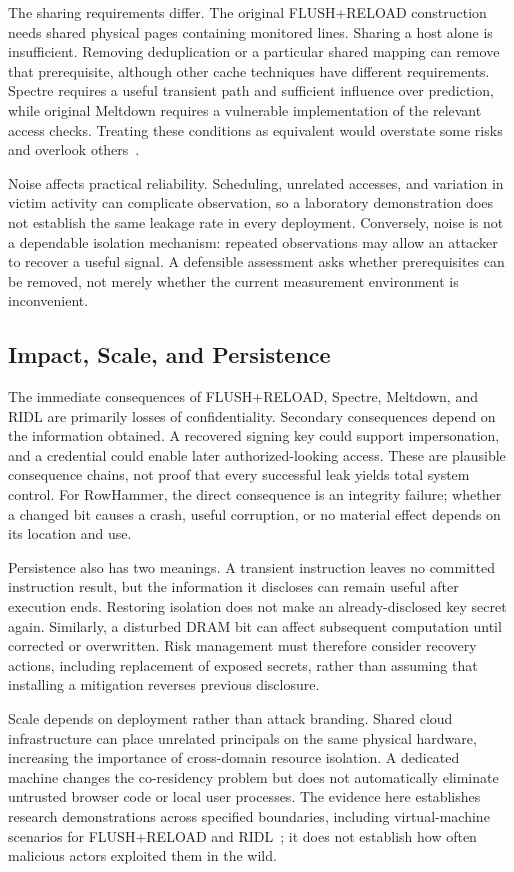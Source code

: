 \documentclass[man,12pt,apacite,nofontenc,nolmodern,floatsintext]{apa6}
\begin{document}
The sharing requirements differ. The original FLUSH+RELOAD construction needs shared physical pages containing monitored lines. Sharing a host alone is insufficient. Removing deduplication or a particular shared mapping can remove that prerequisite, although other cache techniques have different requirements. Spectre requires a useful transient path and sufficient influence over prediction, while original Meltdown requires a vulnerable implementation of the relevant access checks. Treating these conditions as equivalent would overstate some risks and overlook others~\cite{canella2019,yarom2014}.

Noise affects practical reliability. Scheduling, unrelated accesses, and variation in victim activity can complicate observation, so a laboratory demonstration does not establish the same leakage rate in every deployment. Conversely, noise is not a dependable isolation mechanism: repeated observations may allow an attacker to recover a useful signal. A defensible assessment asks whether prerequisites can be removed, not merely whether the current measurement environment is inconvenient.

\subsection{Impact, Scale, and Persistence}
The immediate consequences of FLUSH+RELOAD, Spectre, Meltdown, and RIDL are primarily losses of confidentiality. Secondary consequences depend on the information obtained. A recovered signing key could support impersonation, and a credential could enable later authorized-looking access. These are plausible consequence chains, not proof that every successful leak yields total system control. For RowHammer, the direct consequence is an integrity failure; whether a changed bit causes a crash, useful corruption, or no material effect depends on its location and use.

Persistence also has two meanings. A transient instruction leaves no committed instruction result, but the information it discloses can remain useful after execution ends. Restoring isolation does not make an already-disclosed key secret again. Similarly, a disturbed DRAM bit can affect subsequent computation until corrected or overwritten. Risk management must therefore consider recovery actions, including replacement of exposed secrets, rather than assuming that installing a mitigation reverses previous disclosure.

Scale depends on deployment rather than attack branding. Shared cloud infrastructure can place unrelated principals on the same physical hardware, increasing the importance of cross-domain resource isolation. A dedicated machine changes the co-residency problem but does not automatically eliminate untrusted browser code or local user processes. The evidence here establishes research demonstrations across specified boundaries, including virtual-machine scenarios for FLUSH+RELOAD and RIDL~\cite{ridl2019,yarom2014}; it does not establish how often malicious actors exploited them in the wild.
\end{document}
